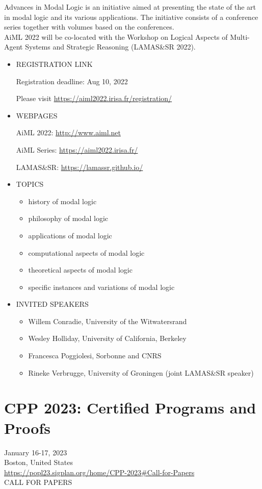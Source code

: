 \documentclass[prodmode,acmtecs]{acmsmall} %
\begin{document}
  Advances in Modal Logic is an initiative aimed at presenting the state of the art in modal logic and its various applications. The initiative consists of a conference series together with volumes based on the conferences.\\ 
  AiML 2022 will be co-located with the Workshop on Logical Aspects of Multi-Agent Systems and Strategic Reasoning (LAMAS\&SR 2022). \\ 
\begin{itemize}\item  REGISTRATION LINK 
 
Registration deadline: Aug 10, 2022 
 
  Please visit \href{https://aiml2022.irisa.fr/registration/}{https://aiml2022.irisa.fr/registration/} 
 
\item  WEBPAGES  
 
  AiML 2022: \href{http://www.aiml.net}{http://www.aiml.net} 
 
  AiML Series: \href{https://aiml2022.irisa.fr/}{https://aiml2022.irisa.fr/} 
 
  LAMAS\&SR: \href{https://lamassr.github.io/}{https://lamassr.github.io/} 
 
\item  TOPICS 
 
\begin{itemize}\item  history of modal logic
\item  philosophy of modal logic
\item  applications of modal logic
\item  computational aspects of modal logic
\item  theoretical aspects of modal logic
\item  specific instances and variations of modal logic
\end{itemize} 
\item  INVITED SPEAKERS 
 
\begin{itemize}\item  Willem Conradie, University of the Witwatersrand 
\item  Wesley Holliday, University of California, Berkeley 
\item  Francesca Poggiolesi, Sorbonne and CNRS 
\item  Rineke Verbrugge, University of Groningen (joint LAMAS\&SR speaker)
\end{itemize} 
\end{itemize}\section{CPP 2023: Certified Programs and Proofs}\label{CPP2023}  January 16-17, 2023 \\ 
  Boston, United States\\ 
  \href{https://popl23.sigplan.org/home/CPP-2023#Call-for-Papers}{https://popl23.sigplan.org/home/CPP-2023\#Call-for-Papers}\\ 
CALL FOR PAPERS 
\end{document}
